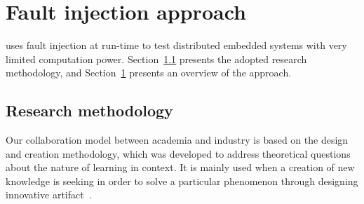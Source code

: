 \section{Fault injection approach}\label{sec:approach}

\approach{} uses fault injection at run-time to test distributed embedded systems with very limited computation power. 
Section~\ref{sec:researchMeth} presents the adopted research methodology, and Section~\ref{sec:approach} presents an overview of the \approach{} approach. 


\subsection{Research methodology}\label{sec:researchMeth}

Our collaboration model between academia and industry is based on the 
design and creation methodology, which was developed to address theoretical questions about the nature of learning
in context. It is mainly used when a creation of new knowledge is seeking in
order to solve a particular phenomenon through designing innovative artifact~\cite{ResMethod}.

